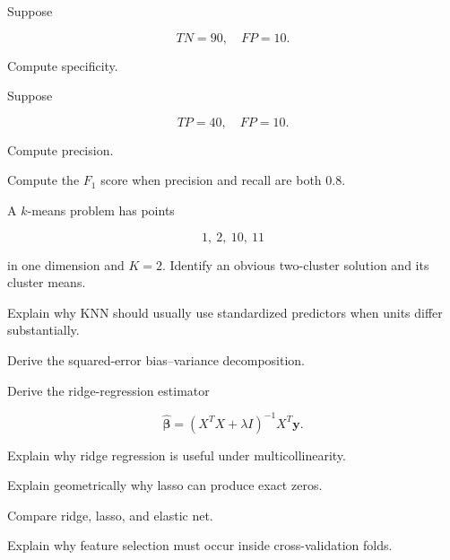 \begin{exercise}[2]
Suppose

\[
TN=90,
\quad
FP=10.
\]

Compute specificity.
\end{exercise}

\begin{exercise}[2]
Suppose

\[
TP=40,
\quad
FP=10.
\]

Compute precision.
\end{exercise}

\begin{exercise}[2]
Compute the \(F_1\) score when precision and recall are both \(0.8\).
\end{exercise}

\begin{exercise}[2]
A \(k\)-means problem has points

\[
1,\ 2,\ 10,\ 11
\]

in one dimension and \(K=2\). Identify an obvious two-cluster solution
and its cluster means.
\end{exercise}

\begin{exercise}[2]
Explain why KNN should usually use standardized predictors when units
differ substantially.
\end{exercise}

\begin{exercise}[3]
Derive the squared-error bias--variance decomposition.
\end{exercise}

\begin{exercise}[3]
Derive the ridge-regression estimator

\[
\widehat{\boldsymbol{\beta}}
=
(
X^TX+\lambda I
)^{-1}
X^T\mathbf{y}.
\]
\end{exercise}

\begin{exercise}[3]
Explain why ridge regression is useful under multicollinearity.
\end{exercise}

\begin{exercise}[3]
Explain geometrically why lasso can produce exact zeros.
\end{exercise}

\begin{exercise}[3]
Compare ridge, lasso, and elastic net.
\end{exercise}

\begin{exercise}[3]
Explain why feature selection must occur inside cross-validation folds.
\end{exercise}

